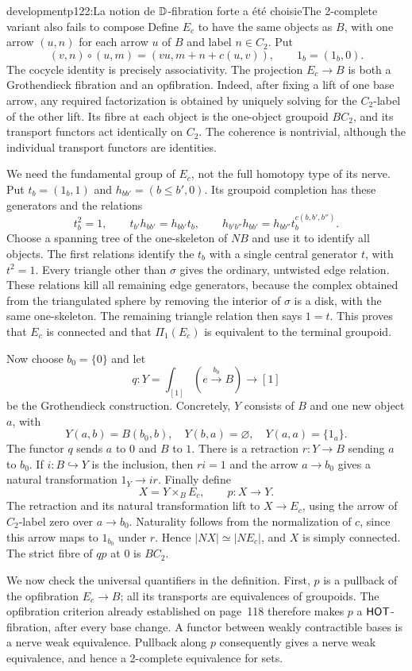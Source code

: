\begin{dcomment}{development}{p122:La notion de $\mathbb{D}$-fibration forte a été choisie}{The 2-complete variant also fails to compose}
Define $E_c$ to have the same objects as $B$, with one arrow $(u,n)$ for each arrow $u$ of $B$ and label $n\in C_2$. Put
\[
 (v,n)\circ(u,m)=(vu,m+n+c(u,v)),
 \qquad 1_b=(1_b,0).
\]
The cocycle identity is precisely associativity. The projection $E_c\to B$ is both a Grothendieck fibration and an opfibration. Indeed, after fixing a lift of one base arrow, any required factorization is obtained by uniquely solving for the $C_2$-label of the other lift. Its fibre at each object is the one-object groupoid $BC_2$, and its transport functors act identically on $C_2$. The coherence is nontrivial, although the individual transport functors are identities.

We need the fundamental group of $E_c$, not the full homotopy type of its nerve. Put $t_b=(1_b,1)$ and $h_{bb'}=(b\leq b',0)$. Its groupoid completion has these generators and the relations
\[
 t_b^2=1,\qquad t_{b'}h_{bb'}=h_{bb'}t_b,
 \qquad
 h_{b'b''}h_{bb'}=h_{bb''}t_b^{c(b,b',b'')}.
\]
Choose a spanning tree of the one-skeleton of $NB$ and use it to identify all objects. The first relations identify the $t_b$ with a single central generator $t$, with $t^2=1$. Every triangle other than $\sigma$ gives the ordinary, untwisted edge relation. These relations kill all remaining edge generators, because the complex obtained from the triangulated sphere by removing the interior of $\sigma$ is a disk, with the same one-skeleton. The remaining triangle relation then says $1=t$. This proves that $E_c$ is connected and that $\Pi_1(E_c)$ is equivalent to the terminal groupoid.

Now choose $b_0=\{0\}$ and let
\[
 q:Y=\int_{[1]}(e\xrightarrow{b_0}B)\longrightarrow[1]
\]
be the Grothendieck construction. Concretely, $Y$ consists of $B$ and one new object $a$, with
\[
 Y(a,b)=B(b_0,b),\quad Y(b,a)=\varnothing,
 \quad Y(a,a)=\{1_a\}.
\]
The functor $q$ sends $a$ to $0$ and $B$ to $1$. There is a retraction $r:Y\to B$ sending $a$ to $b_0$. If $i:B\hookrightarrow Y$ is the inclusion, then $ri=1$ and the arrow $a\to b_0$ gives a natural transformation $1_Y\to ir$. Finally define
\[
 X=Y\times_B E_c,\qquad p:X\longrightarrow Y.
\]
The retraction and its natural transformation lift to $X\to E_c$, using the arrow of $C_2$-label zero over $a\to b_0$. Naturality follows from the normalization of $c$, since this arrow maps to $1_{b_0}$ under $r$. Hence $|NX|\simeq|NE_c|$, and $X$ is simply connected. The strict fibre of $qp$ at $0$ is $BC_2$.

We now check the universal quantifiers in the definition. First, $p$ is a pullback of the opfibration $E_c\to B$; all its transports are equivalences of groupoids. The opfibration criterion already established on page~118 therefore makes $p$ a $\mathsf{HOT}$-fibration, after every base change. A functor between weakly contractible bases is a nerve weak equivalence. Pullback along $p$ consequently gives a nerve weak equivalence, and hence a 2-complete equivalence for sets.


\end{dcomment}
